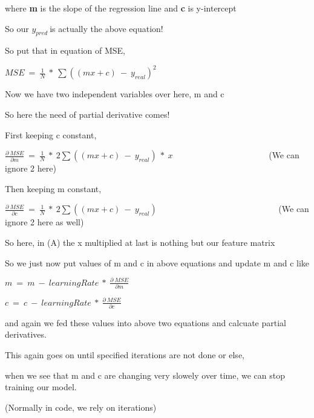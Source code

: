 where \textbf{m} is the slope of the regression line and \textbf{c} is y-intercept





So our $\displaystyle y_{pred} \ $is actually the above equation!



So put that in equation of MSE,





$\displaystyle MSE\ =\ \frac{1}{N} \ *\ \sum (( mx+c) \ -\ y_{real})^{2}$



Now we have two independent variables over here, m and c

So here the need of partial derivative comes!





First keeping c constant,





$\displaystyle \frac{\partial \ MSE}{\partial m} \ =\ \frac{1}{N} \ *\ 2\sum (( mx+c) \ -\ y_{real}) \ *\ x$ \ \ \ \ \ \ \ \ \ \ \ \ \ \ \ \ \ \ \ \ \ \ (We can ignore 2 here)







Then keeping m constant,



$\displaystyle \frac{\partial \ MSE}{\partial c} \ =\ \frac{1}{N} \ *\ 2\sum (( mx+c) \ -\ y_{real})$ \ \ \ \ \ \ \ \ \ \ \ \ \ \ \ \ \ \ \ \ \ \ \ \ \ \ \ \ (We can ignore 2 here as well)







So here, in (A) the x multiplied at last is nothing but our feature matrix

So we just now put values of m and c in above equations and update m and c like





$\displaystyle m\ =\ m\ -\ learningRate\ *\ \frac{\partial \ MSE}{\partial m}$





$\displaystyle c\ =\ c\ -\ learningRate\ *\ \frac{\partial \ MSE}{\partial c}$





and again we fed these values into above two equations and calcuate partial derivatives.

This again goes on until specified iterations are not done or else,

when we see that m and c are changing very slowely over time, we can stop training our model.

(Normally in code, we rely on iterations)


